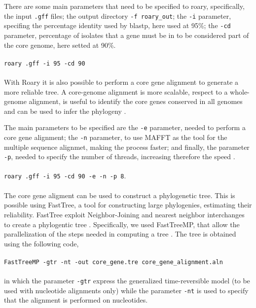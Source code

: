 \documentclass[a4paper,titlepage, oneside]{book}
\newcommand{\code}[1]{\colorbox{light-gray}{\texttt{#1}}}
\begin{document}
There are some main parameters that need to be specified to roary, specifically, the input \code{.gff} files; the output directory \code{-f roary\_out}; the \code{-i} parameter, specifing the percentage identity used by blastp, here used at 95\%; the \code{-cd} parameter, percentage of isolates that a gene must be in to be considered part of the core genome, here setted at 90\%.
\\ \newline \\ \code{roary .gff -i 95 -cd 90} \\ \newline \\


With Roary it is also possible to perform a core gene alignment to generate a more reliable tree. A core-genome alignment is more scalable, respect to a whole-genome alignment, is useful to identify the core genes conserved in all genomes and can be used to infer the phylogeny \cite{Core-align}.

The main parameters to be specified are the \code{-e} parameter, needed to perform a core gene alignment; the \code{-n} parameter, to use MAFFT as the tool for the multiple sequence alignmet, making the process faster; and finally, the parameter \code{-p}, needed to specify the number of threads, increasing therefore the speed \cite{Roary}.
\\
\newline
\\
\code{roary .gff -i 95 -cd 90 -e -n -p 8}.
\\
\newline
\\
The core gene aligment can be used to construct a phylogenetic tree. This is possible using FastTree, a tool for constructing large phylogenies, estimating their reliability. FastTree exploit Neighbor-Joining and nearest neighbor interchanges to create a phylogentic tree \cite{FastTree}.
Specifically, we used FastTreeMP, that allow the parallelization of the steps needed in computing a tree \cite{FTMP}.
The tree is obtained using the following code,\\ \newline \\ \code{FastTreeMP -gtr -nt -out core\_gene.tre core\_gene\_alignment.aln}\\ \newline \\ in which the parameter \code{-gtr} express the generalized time-reversible model (to be used with nucleotide alignments only) while the parameter \code{-nt} is used to specify that the alignment is performed on nucleotides.
\end{document}
